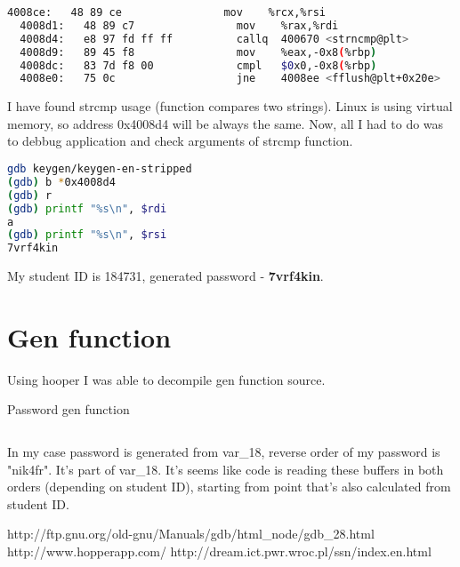 \documentclass[a4paper, 11pt]{article}
\begin{document}
\begin{lstlisting}[language=bash]
  4008ce:	48 89 ce             	mov    %rcx,%rsi
  4008d1:	48 89 c7             	mov    %rax,%rdi
  4008d4:	e8 97 fd ff ff       	callq  400670 <strncmp@plt>
  4008d9:	89 45 f8             	mov    %eax,-0x8(%rbp)
  4008dc:	83 7d f8 00          	cmpl   $0x0,-0x8(%rbp)
  4008e0:	75 0c                	jne    4008ee <fflush@plt+0x20e>
\end{lstlisting}

I have found strcmp usage (function compares two strings). Linux is using virtual memory, so address 0x4008d4 will be always the same.
Now, all I had to do was to debbug application and check arguments of strcmp function.

\begin{lstlisting}[language=bash]
gdb keygen/keygen-en-stripped
(gdb) b *0x4008d4
(gdb) r
(gdb) printf "%s\n", $rdi
a
(gdb) printf "%s\n", $rsi
7vrf4kin
\end{lstlisting}

My student ID is 184731, generated password - \textbf{7vrf4kin}.

\section*{Gen function}

Using hooper I was able to decompile gen function source.

\begin{listing}[!htb]
\caption{Password gen function}
\inputminted[mathescape, fontfamily=tt, frame=leftline,framerule=0.4pt,framesep=2mm]{c}{keygen.c}
\end{listing}

In my case password is generated from var\_18, reverse order of my password is "nik4fr". It's part of var\_18.
It's seems like code is reading these buffers in both orders (depending on student ID), starting from point that's also calculated from student ID.

\begin{thebibliography}{9}

  http://ftp.gnu.org/old-gnu/Manuals/gdb/html\_node/gdb\_28.html
 http://www.hopperapp.com/
 http://dream.ict.pwr.wroc.pl/ssn/index.en.html

\end{thebibliography}
\end{document}

